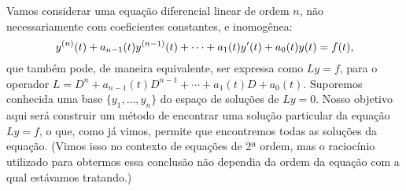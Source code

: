 \documentclass[12pt,a4paper,oneside]{memoir}
\begin{document}
Vamos considerar uma equação diferencial linear de ordem $n$, não necessariamente com coeficientes constantes, e inomogênea:
\begin{equation}
  y^{(n)} (t) + a_{n-1}(t) y^{(n-1)} (t) + \cdots + a_1(t) y'(t) + a_0(t) y(t) = f(t) \text,
\end{equation}
que também pode, de maneira equivalente, ser expressa como $Ly = f$, para o operador $L = D^n + a_{n-1}(t) D^{n-1} + \cdots + a_1(t) D + a_0(t)$.  Suporemos conhecida uma base $\{y_1, \ldots, y_n\}$ do espaço de soluções de $Ly = 0$.  Nosso objetivo aqui será construir um método de encontrar uma solução particular da equação $Ly = f$, o que, como já vimos, permite que encontremos todas as soluções da equação.  (Vimos isso no contexto de equações de 2ª ordem, mas o raciocínio utilizado para obtermos essa conclusão não dependia da ordem da equação com a qual estávamos tratando.)
\end{document}
